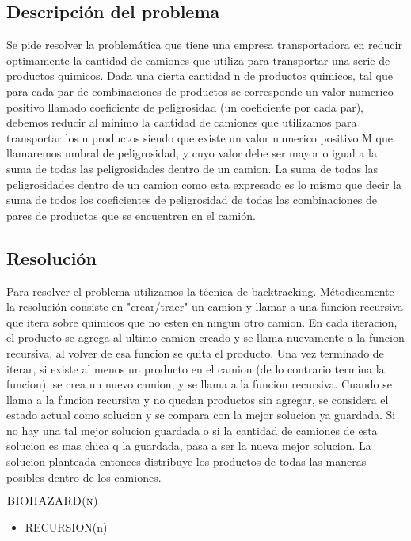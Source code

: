 \subsection{Descripci\'on del problema}

Se pide resolver la problem\'atica que tiene una empresa transportadora en reducir optimamente la cantidad de camiones que utiliza para transportar una serie de productos quimicos. 
Dada una cierta cantidad n de productos quimicos, tal que para cada par de combinaciones de productos se corresponde un valor numerico positivo llamado coeficiente de peligrosidad (un coeficiente por cada par), debemos reducir al minimo la cantidad de camiones que utilizamos para transportar los n productos siendo que existe un valor numerico positivo M que llamaremos umbral de peligrosidad, y cuyo valor debe ser mayor o igual a la suma de todas las peligrosidades dentro de un camion. La suma de todas las peligrosidades dentro de un camion como esta expresado es lo mismo que decir la suma de todos los coeficientes de peligrosidad de todas las combinaciones de pares de productos que se encuentren en el cami\'on.

\subsection{Resoluci\'on}

Para resolver el problema utilizamos la t\'ecnica de backtracking. 
M\'etodicamente la resoluci\'on consiste en "crear/traer" un camion y llamar a una funcion recursiva que itera sobre quimicos que no esten en ningun otro camion. En cada iteracion, el producto se agrega al ultimo camion creado y se llama nuevamente a la funcion recursiva, al volver de esa funcion se quita el producto. Una vez terminado de iterar, si existe al menos un producto en el camion (de lo contrario termina la funcion), se crea un nuevo camion, y se llama a la funcion recursiva.
Cuando se llama a la funcion recursiva y no quedan productos sin agregar, se considera el estado actual como solucion y se compara con la mejor solucion ya guardada. Si no hay una tal mejor solucion guardada o si la cantidad de camiones de esta solucion es mas chica q la guardada, pasa a ser la nueva mejor solucion.
La solucion planteada entonces distribuye los productos de todas las maneras posibles dentro de los camiones. 


$\textnormal{\scshape BIOHAZARD(n)}$
\begin{itemize}
	\item RECURSION(n)		
\end{itemize} 

